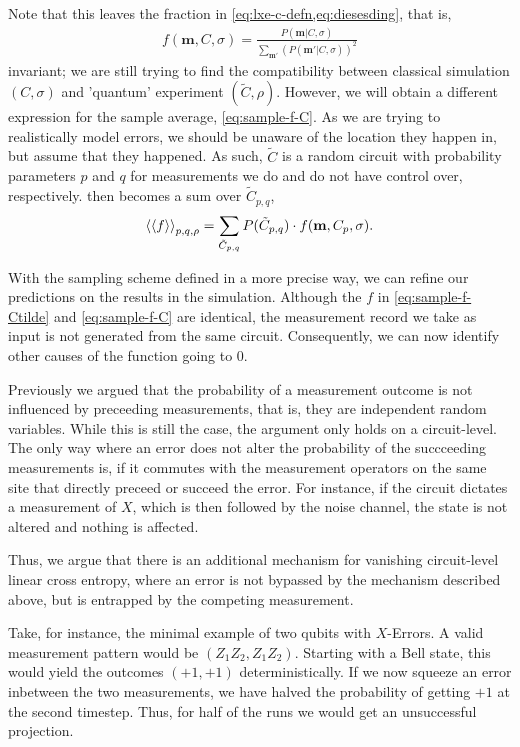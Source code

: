Note that this leaves the fraction in \cref{eq:lxe-c-defn,eq:diesesding}, that
is,
\begin{align}
      f(\mathbf{m}, C, \sigma) = \frac{P(\mathbf{m} |
     C,\sigma)}{\sum_{\mathbf{m'}}\left(P(\mathbf{m}'|C,\sigma)\right)^2}
\end{align}
invariant;
we are still trying to find the compatibility
between classical simulation $(C, \sigma)$ and 'quantum' experiment
$(\tilde{C}, \rho)$.  However, we will obtain a different expression for the
sample average, \cref{eq:sample-f-C}. As we are trying to realistically
model errors, we should be unaware of the location they happen in, but assume
that they happened. As such, $\tilde{C}$ is a random circuit with probability
parameters $p$ and $q$ for measurements we do and do not have control over, respectively.
 then becomes a sum over $\tilde{C}_{p,q}$,
\begin{align}
  \label{eq:sample-f-Ctilde} \expval{\expval{f}}_{p,q,\rho} =
\sum_{\tilde{C}_{p,q}} P(\tilde{C}_{p,q}) \cdot f(\mathbf{m},C_p, \sigma)
.\end{align}

With the sampling scheme defined in a more precise way, we can refine our
predictions on the results in the simulation. Although the $f$ in
\cref{eq:sample-f-Ctilde} and \cref{eq:sample-f-C} are identical, the
measurement record we take as input is not generated from the same circuit.
Consequently, we can now identify other causes of the function going to $0$.

Previously we argued that the probability of a
measurement outcome is not influenced by preceeding measurements, that is, they
are independent random variables. While this is still the case, the argument
only holds on a circuit-level. The only way where an error does not alter the
probability of the succceeding measurements is, if it commutes with the
measurement operators on the same site that directly preceed or succeed the
error. For instance, if the circuit dictates a measurement of $X$, which is
then followed by the noise channel, the state is not altered and nothing is
affected.

Thus, we argue that there is an additional mechanism for vanishing
circuit-level linear cross entropy, where an error is not bypassed by the
mechanism described above, but is entrapped by the competing measurement.

Take, for instance, the minimal example of two qubits with $X$-Errors.
A valid measurement pattern would be $(Z_1Z_2, Z_1Z_2)$. Starting with a
Bell state, this would yield the outcomes $(+1, +1)$ deterministically. If
we now squeeze an error inbetween the two measurements, we have halved the
probability of getting $+1$ at the second timestep. Thus, for half of the runs
we would get an unsuccessful projection. 


